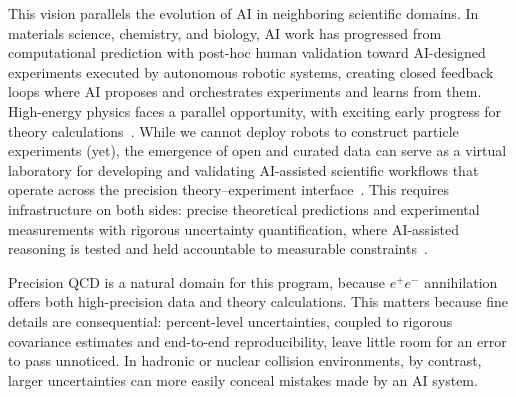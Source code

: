 This vision parallels the evolution of AI in neighboring scientific domains. In
materials science, chemistry, and biology, AI work has progressed from computational
prediction with post-hoc human validation toward AI-designed experiments executed
by autonomous robotic systems, creating closed feedback loops where AI proposes and orchestrates experiments and learns from them. High-energy physics faces a parallel opportunity, with exciting early progress for theory calculations~\cite{Abolhasani:2023sdl,MacLeod:2020sdl,Chen:2024scienceagentbench,Lu:2024aiscientist,Woodruff:2026practicalsi,Bubeck:2025coscientist,OpenAITheory:2026singleminus,Schwartz:2026cparameterllm}.
While we cannot deploy robots to construct particle experiments (yet), the emergence of open and curated data can serve as a
virtual laboratory for developing and validating AI-assisted scientific workflows
that operate across the precision theory--experiment
interface~\cite{Badea:2019vey,Chen:2021uws}.  This requires infrastructure on both sides: precise theoretical predictions and experimental measurements with rigorous uncertainty quantification, where AI-assisted reasoning is tested and held accountable to measurable constraints~\cite{Wang:2023aai,Messeri:2024aiu,Woodruff:2026practicalsi}.

Precision QCD is a natural domain for this program, because $e^{+}e^{-}$ annihilation offers both high-precision data and theory calculations. This matters because fine details are consequential: percent-level uncertainties, coupled to rigorous covariance estimates and end-to-end reproducibility, leave little room for an error to pass unnoticed. In hadronic or nuclear collision environments, by contrast, larger uncertainties can more easily conceal mistakes made by an AI system.

